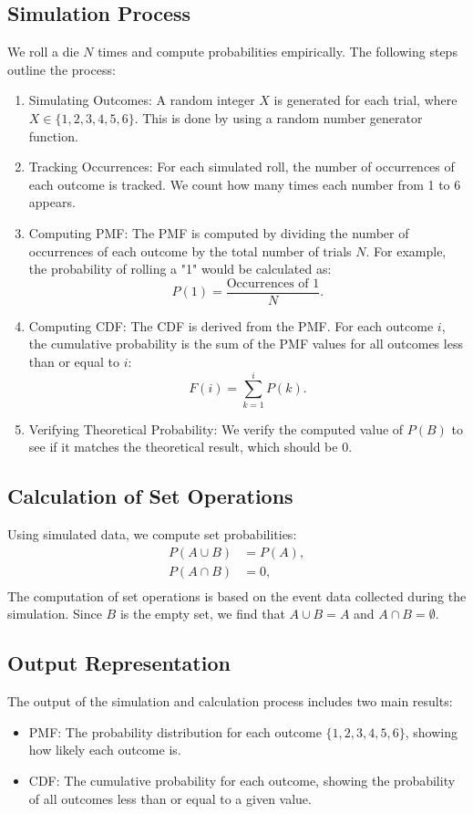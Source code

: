 \documentclass[journal]{IEEEtran}
\begin{document}
\subsection*{Simulation Process}
We roll a die \( N \) times and compute probabilities empirically. The following steps outline the process:
\begin{enumerate}
    \item Simulating Outcomes: A random integer \( X \) is generated for each trial, where \( X \in \{1, 2, 3, 4, 5, 6\} \). This is done by using a random number generator function.
    \item Tracking Occurrences: For each simulated roll, the number of occurrences of each outcome is tracked. We count how many times each number from 1 to 6 appears.
    \item Computing PMF: The PMF is computed by dividing the number of occurrences of each outcome by the total number of trials \( N \). For example, the probability of rolling a "1" would be calculated as:
    \[
    P(1) = \frac{\text{Occurrences of 1}}{N}.
    \]
    \item Computing CDF: The CDF is derived from the PMF. For each outcome \( i \), the cumulative probability is the sum of the PMF values for all outcomes less than or equal to \( i \):
    \[
    F(i) = \sum_{k=1}^{i} P(k).
    \]
    \item Verifying Theoretical Probability: We verify the computed value of \( P(B) \) to see if it matches the theoretical result, which should be 0.
\end{enumerate}

\subsection*{Calculation of Set Operations}
Using simulated data, we compute set probabilities:
\begin{align}
    P(A \cup B) &= P(A), \\
    P(A \cap B) &= 0, \\
\end{align}
The computation of set operations is based on the event data collected during the simulation. Since \( B \) is the empty set, we find that \( A \cup B = A \) and \( A \cap B = \emptyset \).

\subsection*{Output Representation}
The output of the simulation and calculation process includes two main results:
\begin{itemize}
    \item PMF: The probability distribution for each outcome \( \{1, 2, 3, 4, 5, 6\} \), showing how likely each outcome is.
    \item CDF: The cumulative probability for each outcome, showing the probability of all outcomes less than or equal to a given value.
\end{itemize}
\end{document}
